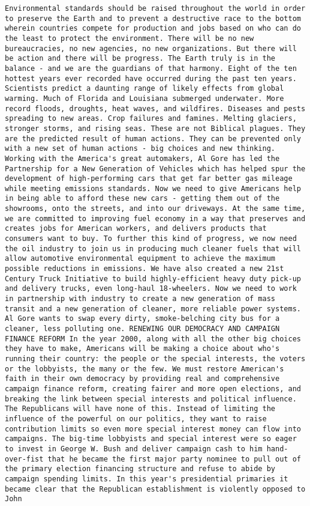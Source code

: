 \documentclass[
]{article}
\begin{document}
\begin{verbatim}
Environmental standards should be raised throughout the world in order to preserve the Earth and to prevent a destructive race to the bottom wherein countries compete for production and jobs based on who can do the least to protect the environment. There will be no new bureaucracies, no new agencies, no new organizations. But there will be action and there will be progress. The Earth truly is in the balance - and we are the guardians of that harmony. Eight of the ten hottest years ever recorded have occurred during the past ten years. Scientists predict a daunting range of likely effects from global warming. Much of Florida and Louisiana submerged underwater. More record floods, droughts, heat waves, and wildfires. Diseases and pests spreading to new areas. Crop failures and famines. Melting glaciers, stronger storms, and rising seas. These are not Biblical plagues. They are the predicted result of human actions. They can be prevented only with a new set of human actions - big choices and new thinking. Working with the America's great automakers, Al Gore has led the Partnership for a New Generation of Vehicles which has helped spur the development of high-performing cars that get far better gas mileage while meeting emissions standards. Now we need to give Americans help in being able to afford these new cars - getting them out of the showrooms, onto the streets, and into our driveways. At the same time, we are committed to improving fuel economy in a way that preserves and creates jobs for American workers, and delivers products that consumers want to buy. To further this kind of progress, we now need the oil industry to join us in producing much cleaner fuels that will allow automotive environmental equipment to achieve the maximum possible reductions in emissions. We have also created a new 21st Century Truck Initiative to build highly-efficient heavy duty pick-up and delivery trucks, even long-haul 18-wheelers. Now we need to work in partnership with industry to create a new generation of mass transit and a new generation of cleaner, more reliable power systems. Al Gore wants to swap every dirty, smoke-belching city bus for a cleaner, less polluting one. RENEWING OUR DEMOCRACY AND CAMPAIGN FINANCE REFORM In the year 2000, along with all the other big choices they have to make, Americans will be making a choice about who's running their country: the people or the special interests, the voters or the lobbyists, the many or the few. We must restore American's faith in their own democracy by providing real and comprehensive campaign finance reform, creating fairer and more open elections, and breaking the link between special interests and political influence. The Republicans will have none of this. Instead of limiting the influence of the powerful on our politics, they want to raise contribution limits so even more special interest money can flow into campaigns. The big-time lobbyists and special interest were so eager to invest in George W. Bush and deliver campaign cash to him hand-over-fist that he became the first major party nominee to pull out of the primary election financing structure and refuse to abide by campaign spending limits. In this year's presidential primaries it became clear that the Republican establishment is violently opposed to John 
\end{verbatim}
\end{document}
